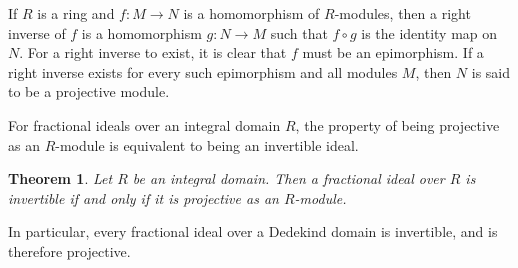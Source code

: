 \documentclass[12pt]{article}
\newtheorem*{theorem*}{Theorem}
\begin{document}

If $R$ is a ring and $f\colon M\rightarrow N$ is a homomorphism of $R$-modules, then a right inverse of $f$ is a  homomorphism $g\colon N\rightarrow M$ such that $f\circ g$ is the identity map on $N$. For a right inverse to exist, it is clear that $f$ must be an epimorphism. If a right inverse exists for every such epimorphism and all modules $M$, then $N$ is said to be a projective module.

For fractional ideals over an integral domain $R$, the property of being projective as an $R$-module is equivalent to being an invertible ideal.

\begin{theorem*}
Let $R$ be an integral domain. Then a fractional ideal over $R$ is invertible if and only if it is projective as an $R$-module.
\end{theorem*}

In particular, every fractional ideal over a Dedekind domain is invertible, and is therefore projective.
\end{document}
